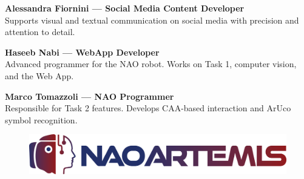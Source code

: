 \documentclass{optica-article}
\begin{document}
\textbf{Alessandra Fiornini — Social Media Content Developer} \\Supports visual and textual communication on social media with precision and attention to detail.

\textbf{Haseeb Nabi — WebApp Developer} \\Advanced programmer for the NAO robot. Works on Task 1, computer vision, and the Web App.

\textbf{Marco Tomazzoli — NAO Programmer} \\Responsible for Task 2 features. Develops CAA-based interaction and ArUco symbol recognition.


\begin{figure}[b]
    \centering
    \includegraphics[scale=0.08]{figures/logo_v3.png}
    \label{fig:logo_con_scritta1}
\end{figure}


\end{document}
